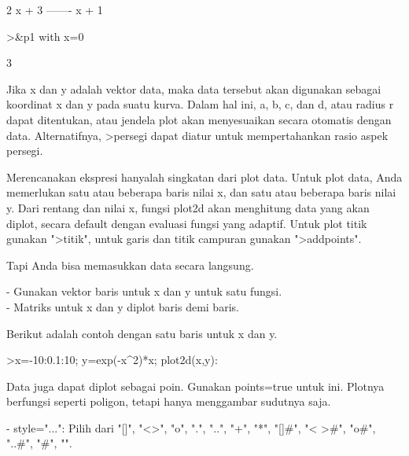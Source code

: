 \documentclass{article}
\begin{document}
\begin{eulernotebook}
\begin{eulercomment}
\begin{eulercomment}
\begin{eulercomment}
\begin{eulercomment}
\begin{eulercomment}
\begin{eulercomment}
\begin{euleroutput}
                                 2 x + 3
                                 -------
                                  x + 1
  
\end{euleroutput}
\begin{eulerprompt}
>&p1 with x=0
\end{eulerprompt}
\begin{euleroutput}
  
                                    3
  
\end{euleroutput}
\begin{eulercomment}
\begin{eulercomment}
\begin{eulercomment}
Jika x dan y adalah vektor data, maka data tersebut akan digunakan
sebagai koordinat x dan y pada suatu kurva. Dalam hal ini, a, b, c,
dan d, atau radius r dapat ditentukan, atau jendela plot akan
menyesuaikan secara otomatis dengan data. Alternatifnya, \textgreater{}persegi
dapat diatur untuk mempertahankan rasio aspek persegi.

Merencanakan ekspresi hanyalah singkatan dari plot data. Untuk plot
data, Anda memerlukan satu atau beberapa baris nilai x, dan satu atau
beberapa baris nilai y. Dari rentang dan nilai x, fungsi plot2d akan
menghitung data yang akan diplot, secara default dengan evaluasi
fungsi yang adaptif. Untuk plot titik gunakan "\textgreater{}titik", untuk garis
dan titik campuran gunakan "\textgreater{}addpoints".

Tapi Anda bisa memasukkan data secara langsung.

- Gunakan vektor baris untuk x dan y untuk satu fungsi.\\
- Matriks untuk x dan y diplot baris demi baris.

Berikut adalah contoh dengan satu baris untuk x dan y.
\end{eulercomment}
\begin{eulerprompt}
>x=-10:0.1:10; y=exp(-x^2)*x; plot2d(x,y):
\end{eulerprompt}
\begin{eulercomment}
Data juga dapat diplot sebagai poin. Gunakan points=true untuk ini.
Plotnya berfungsi seperti poligon, tetapi hanya menggambar sudutnya
saja.

- style="...": Pilih dari "[]", "\textless{}\textgreater{}", "o", ".", "..", "+", "*", "[]#",
"\textless{} \textgreater{}#", "o#", "..#", "#", "\textbar{}".


\end{eulercomment}
\end{eulercomment}
\end{eulercomment}
\end{eulercomment}
\end{eulercomment}
\end{eulercomment}
\end{eulercomment}
\end{eulercomment}
\end{eulercomment}
\end{eulernotebook}
\end{document}
